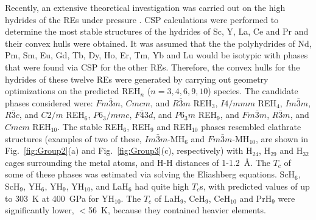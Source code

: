 \documentclass[12pt,letterpaper,oneside]{article}
\begin{document}
Recently, an extensive theoretical investigation was carried out on the high hydrides of the REs under pressure \cite{Peng:Sc-2017}. CSP calculations were performed to determine the most stable structures of the hydrides of Sc, Y, La, Ce and Pr and their convex hulls were obtained. It was assumed that the the polyhydrides of Nd, Pm, Sm, Eu, Gd, Tb, Dy, Ho, Er, Tm, Yb and Lu would be isotypic with phases that were found via CSP for the other REs. Therefore, the convex hulls for the hydrides of these twelve REs were generated by carrying out geometry optimizations on the predicted REH$_n$ ($n=3,4,6,9,10$) species. The candidate phases considered were: $Fm\bar{3}m$, $Cmcm$, and $R\bar{3}m$ REH$_3$, $I4/mmm$ REH$_4$, $Im\bar{3}m$, $R\bar{3}c$, and $C2/m$ REH$_6$, $P6_3/mmc$, $F\bar{4}3d$, and $P6_3m$ REH$_9$, and $Fm\bar{3}m$, $R\bar{3}m$, and $Cmcm$ REH$_{10}$. The stable REH$_6$, REH$_9$ and REH$_{10}$ phases resembled clathrate structures (examples of two of these, $Im\bar{3}m$-MH$_6$ and $Fm\bar{3}m$-MH$_{10}$, are shown in Fig.\ \ref{fig:Group2}(a) and Fig.\ \ref{fig:Group3}(c), respectively) with H$_{24}$, H$_{29}$ and H$_{32}$ cages surrounding the metal atoms, and H-H distances of 1-1.2~\AA{}. The $T_c$ of some of these phases was estimated via solving the Eliashberg equations. ScH$_6$, ScH$_9$, YH$_6$, YH$_9$, YH$_{10}$, and LaH$_{6}$ had quite high $T_c$s, with predicted values of up to 303~K at 400~GPa for YH$_{10}$. The $T_c$ of LaH$_9$, CeH$_9$, CeH$_{10}$ and PrH$_9$ were significantly lower, $<$56~K, because they contained heavier elements.
\end{document}
